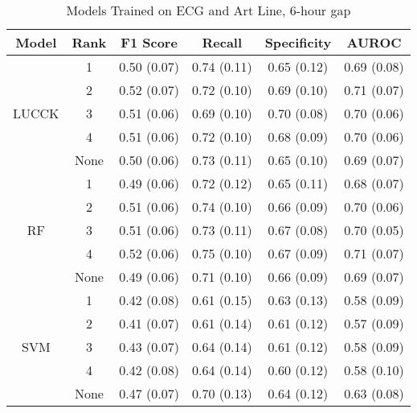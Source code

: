 \begin{table}
    \small
    \centering
    \caption{Models Trained on ECG and Art Line, 6-hour gap}
    \begin{tabularx}{\textwidth}{|c|c|C|C|C|C|}
        \hline
        Model & Rank & F1 Score & Recall & Specificity & AUROC \\
        \hline
         & 1 & 0.50 (0.07) & 0.74 (0.11) & 0.65 (0.12) & 0.69 (0.08)\\
         & 2 & 0.52 (0.07) & 0.72 (0.10) & 0.69 (0.10) & 0.71 (0.07)\\
        LUCCK & 3 & 0.51 (0.06) & 0.69 (0.10) & 0.70 (0.08) & 0.70 (0.06)\\
         & 4 & 0.51 (0.06) & 0.72 (0.10) & 0.68 (0.09) & 0.70 (0.06)\\
         & None & 0.50 (0.06) & 0.73 (0.11) & 0.65 (0.10) & 0.69 (0.07)\\
         \hline
         & 1 & 0.49 (0.06) & 0.72 (0.12) & 0.65 (0.11) & 0.68 (0.07)\\
         & 2 & 0.51 (0.06) & 0.74 (0.10) & 0.66 (0.09) & 0.70 (0.06)\\
         RF & 3 & 0.51 (0.06) & 0.73 (0.11) & 0.67 (0.08) & 0.70 (0.05)\\
         & 4 & 0.52 (0.06) & 0.75 (0.10) & 0.67 (0.09) & 0.71 (0.07)\\
         & None & 0.49 (0.06) & 0.71 (0.10) & 0.66 (0.09) & 0.69 (0.07)\\
         \hline
         & 1 & 0.42 (0.08) & 0.61 (0.15) & 0.63 (0.13) & 0.58 (0.09)\\
         & 2 & 0.41 (0.07) & 0.61 (0.14) & 0.61 (0.12) & 0.57 (0.09)\\
         SVM & 3 & 0.43 (0.07) & 0.64 (0.14) & 0.61 (0.12) & 0.58 (0.09)\\
         & 4 & 0.42 (0.08) & 0.64 (0.14) & 0.60 (0.12) & 0.58 (0.10)\\
         & None & 0.47 (0.07) & 0.70 (0.13) & 0.64 (0.12) & 0.63 (0.08)\\
         \hline
    \end{tabularx}
\end{table}

